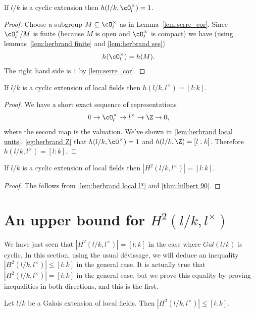 \begin{lemma}\label{lem:herbrand local units}
	If $l/k$ is a cyclic extension then $h(l/k, \cO_l^\times) = 1$.
\end{lemma}

\begin{proof}
	Choose a subgroup $M\subseteq \cO_l^\times$ as in Lemma~\ref{lem:serre_cor}.
	Since $\cO_l^\times / M$ is finite (because $M$ is open and $\cO_l^\times$ is compact)
	we have
	(using lemmas~\ref{lem:herbrand finite} and \ref{lem:herbrand ses})
	\[
		h(\cO_l^\times) = h(M).
	\]
	The right hand side is $1$ by \ref{lem:serre_cor}.
\end{proof}

\begin{lemma} \label{lem:herbrand local l*}
	If $l/k$ is a cyclic extension of local fields
	then $h(l/k, l^\times)= [l:k]$.
\end{lemma}

\begin{proof}
	We have a short exact sequence of representations
	\[
		0 \to \cO_l^\times \to l^\times \to \Z \to 0,
 	\]
	where the second map is the valuation.
	We've shown in \ref{lem:herbrand local units}, \ref{eg:herbrand Z}
	that $h(l/k,\cO^\times)=1$ and $h(l/k,\Z) = [l:k]$.
	Therefore $h(l/k,l^\times) = [l:k]$.
\end{proof}


\begin{lemma} \label{lem:local H2 l*}
	If $l/k$ is a cyclic extension of local fields
	then $|H^2(l/k,l^\times)| = [l:k]$.
\end{lemma}

\begin{proof}
	The follows from \ref{lem:herbrand local l*} and \ref{thm:hilbert 90}.
\end{proof}




\section{An upper bound for \texorpdfstring{$H^2(l/k,l^\times)$}{H2(l/k,l*)}}

We have just seen that $|H^2(l/k,l^\times)|=[l:k]$ in the case where $Gal(l/k)$ is
cyclic. In this section, using the usual d\'evissage, we will deduce an
inequality $|H^2(l/k,l^\times)|\leq[l:k]$ in the general case. It is actually
true that $|H^2(l/k,l^\times)|=[l:k]$ in the general case, but we prove this
equality by proving inequalities in both directions, and this is the first.
\begin{theorem} \label{lem:local H2 upper bound}
	Let $l/k$ be a Galois extension of local fields.
	Then $|H^2(l/k,l^\times)| \le [l:k]$.
\end{theorem}


